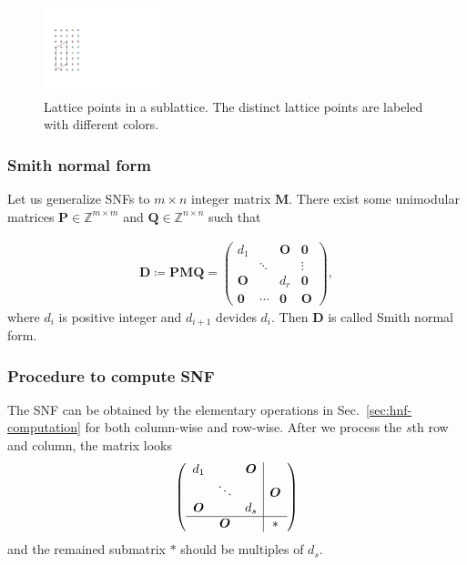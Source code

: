 \begin{figure}[htb]
  \centering
  \includegraphics[width=0.3\textwidth]{figure/fig_sublattice.pdf}
  \caption{
    Lattice points in a sublattice.
    The distinct lattice points are labeled with different colors.
  }
  \label{fig:hnf_supercell}
\end{figure}



\subsubsection{Smith normal form}

Let us generalize SNFs to $m \times n$ integer matrix $\bm{M}$.
There exist some unimodular matrices $\bm{P} \in \mathbb{Z}^{m \times m}$ and $\bm{Q} \in \mathbb{Z}^{n \times n}$ such that

\begin{align}
    \bm{D}
    \coloneqq
    \bm{PMQ}
    =
    \begin{pmatrix}
        d_{1}  &        & \bm{O} & \bm{0} \\
               & \ddots &        & \vdots \\
        \bm{O} &        & d_{r}  & \bm{0} \\
        \bm{0} & \cdots & \bm{0} & \bm{O}
    \end{pmatrix},
\end{align}
where $d_{i}$ is positive integer and $d_{i+1}$ devides $d_{i}$.
Then $\bm{D}$ is called Smith normal form.

\subsubsection{Procedure to compute SNF}

The SNF can be obtained by the elementary operations in Sec.~\ref{sec:hnf-computation} for both column-wise and row-wise.
After we process the $s$th row and column, the matrix looks
\begin{align*}
  \left(
    \begin{array}{ccc|c}
      d_{1} &        & \bm{O} &        \\
             & \ddots &        & \bm{O} \\
      \bm{O} &        & d_{s}  &        \\ \hline
             & \bm{O} &        & \ast   \\
    \end{array}
  \right)
\end{align*}
and the remained submatrix $\ast$ should be multiples of $d_{s}$.


